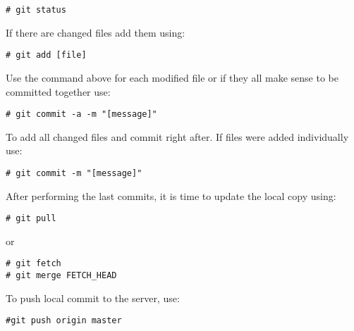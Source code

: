 \documentclass[envcountsame,envcountchap]{svmono}
\begin{document}
\begin{verbatim}
# git status
\end{verbatim}

If there are changed files add them using:

\begin{verbatim}
# git add [file]
\end{verbatim}

Use the command above for each modified file or if they all make sense to be committed together use:

\begin{verbatim}
# git commit -a -m "[message]"
\end{verbatim}

To add all changed files and commit right after. If files were added individually use:

\begin{verbatim}
# git commit -m "[message]"
\end{verbatim}

After performing the last commits, it is time to update the local copy using:

\begin{verbatim}
# git pull
\end{verbatim}

or

\begin{verbatim}
# git fetch
# git merge FETCH_HEAD
\end{verbatim}

To push local commit to the server, use:

\begin{verbatim}
#git push origin master
\end{verbatim}

\backmatter

\printindex
\end{document}
